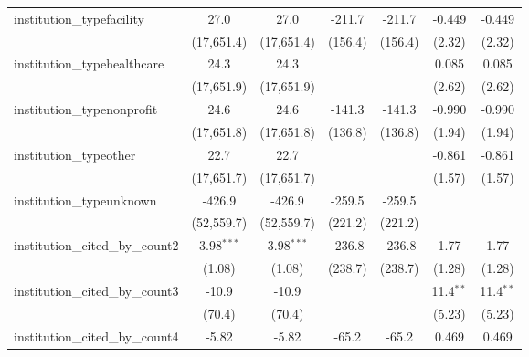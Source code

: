 \begin{tabular}{lcccccc}
   institution\_typefacility             & 27.0          & 27.0          & -211.7        & -211.7        & -0.449        & -0.449\\   
                                         & (17,651.4)    & (17,651.4)    & (156.4)       & (156.4)       & (2.32)        & (2.32)\\   
   institution\_typehealthcare           & 24.3          & 24.3          &               &               & 0.085         & 0.085\\   
                                         & (17,651.9)    & (17,651.9)    &               &               & (2.62)        & (2.62)\\   
   institution\_typenonprofit            & 24.6          & 24.6          & -141.3        & -141.3        & -0.990        & -0.990\\   
                                         & (17,651.8)    & (17,651.8)    & (136.8)       & (136.8)       & (1.94)        & (1.94)\\   
   institution\_typeother                & 22.7          & 22.7          &               &               & -0.861        & -0.861\\   
                                         & (17,651.7)    & (17,651.7)    &               &               & (1.57)        & (1.57)\\   
   institution\_typeunknown              & -426.9        & -426.9        & -259.5        & -259.5        &               &   \\   
                                         & (52,559.7)    & (52,559.7)    & (221.2)       & (221.2)       &               &   \\   
   institution\_cited\_by\_count2        & 3.98$^{***}$  & 3.98$^{***}$  & -236.8        & -236.8        & 1.77          & 1.77\\   
                                         & (1.08)        & (1.08)        & (238.7)       & (238.7)       & (1.28)        & (1.28)\\   
   institution\_cited\_by\_count3        & -10.9         & -10.9         &               &               & 11.4$^{**}$   & 11.4$^{**}$\\   
                                         & (70.4)        & (70.4)        &               &               & (5.23)        & (5.23)\\   
   institution\_cited\_by\_count4        & -5.82         & -5.82         & -65.2         & -65.2         & 0.469         & 0.469\\   

\end{tabular}
